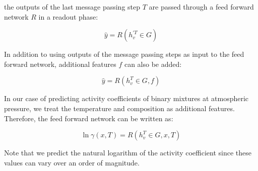 the outputs of the last message passing step $T$ are passed through a feed forward network $R$ in a readout phase:
 
\begin{equation}
    \hat y = R(h_v^{'T} \in G)
\end{equation}

In addition to using outputs of the message passing steps as input to the feed forward network, additional features $f$ can also be added:

\begin{equation}
    \hat y = R(h_v^T \in G, f)
\end{equation}

In our case of predicting activity coefficients of binary mixtures at atmospheric pressure, we treat the temperature and composition as additional features. Therefore, the feed forward network can be written as:

\begin{equation}
   \ln \gamma(x,T)= R(h_v^T \in G, x, T)
\end{equation}

Note that we predict the natural logarithm of the activity coefficient since these values can vary over an order of magnitude.




